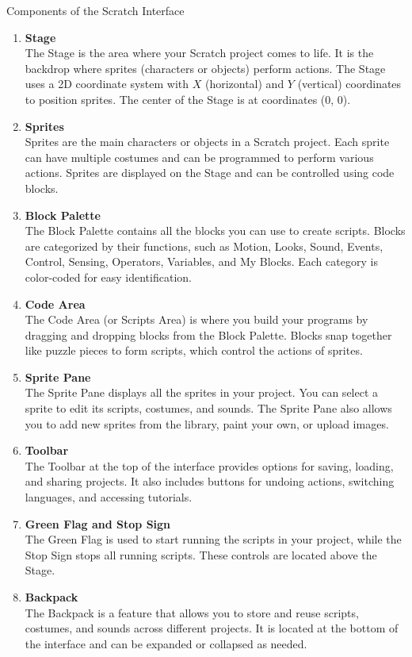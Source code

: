 \documentclass[main.tex]{subfiles}
\begin{document}
{Components of the Scratch Interface}
{
  \begin{enumerate}[label=\textbf{\arabic*.}, leftmargin=2em]
    \item \textbf{Stage} \\
      The Stage is the area where your Scratch project comes to life. It is the backdrop where sprites (characters or objects) perform actions. The Stage uses a 2D coordinate system with \(X\) (horizontal) and \(Y\) (vertical) coordinates to position sprites. The center of the Stage is at coordinates (0, 0).

    \item \textbf{Sprites} \\
      Sprites are the main characters or objects in a Scratch project. Each sprite can have multiple costumes and can be programmed to perform various actions. Sprites are displayed on the Stage and can be controlled using code blocks.

    \item \textbf{Block Palette} \\
      The Block Palette contains all the blocks you can use to create scripts. Blocks are categorized by their functions, such as Motion, Looks, Sound, Events, Control, Sensing, Operators, Variables, and My Blocks. Each category is color-coded for easy identification.

    \item \textbf{Code Area} \\
      The Code Area (or Scripts Area) is where you build your programs by dragging and dropping blocks from the Block Palette. Blocks snap together like puzzle pieces to form scripts, which control the actions of sprites.

    \item \textbf{Sprite Pane} \\
      The Sprite Pane displays all the sprites in your project. You can select a sprite to edit its scripts, costumes, and sounds. The Sprite Pane also allows you to add new sprites from the library, paint your own, or upload images.

    \item \textbf{Toolbar} \\
      The Toolbar at the top of the interface provides options for saving, loading, and sharing projects. It also includes buttons for undoing actions, switching languages, and accessing tutorials.

    \item \textbf{Green Flag and Stop Sign} \\
      The Green Flag is used to start running the scripts in your project, while the Stop Sign stops all running scripts. These controls are located above the Stage.

    \item \textbf{Backpack} \\
      The Backpack is a feature that allows you to store and reuse scripts, costumes, and sounds across different projects. It is located at the bottom of the interface and can be expanded or collapsed as needed.
  \end{enumerate}

}
\end{document}

